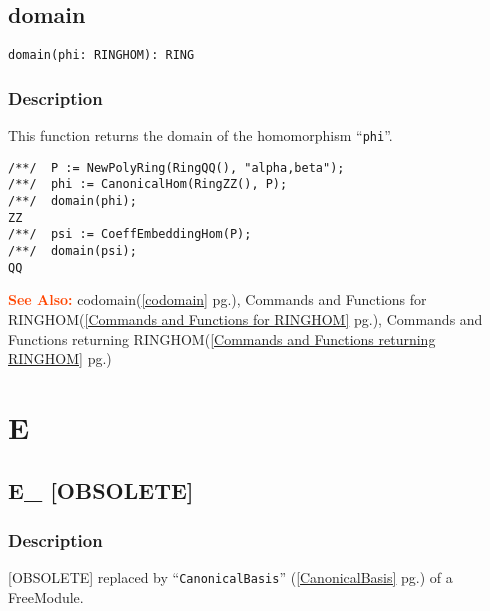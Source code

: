 \documentclass[a4paper]{mybook}
\newenvironment{command}{}{} %
\newcommand\SeeAlso{\par\textcolor{OrangeRed}{\textbf{\large See Also: }}}
\begin{document}
\section{domain}
\label{domain}
\begin{command} %


\begin{Verbatim}[label=syntax, rulecolor=\color{MidnightBlue},
frame=single]
domain(phi: RINGHOM): RING
\end{Verbatim}


\subsection*{Description}

This function returns the domain of the homomorphism ``\verb&phi&''.
\begin{Verbatim}[label=example, rulecolor=\color{PineGreen}, frame=single]
/**/  P := NewPolyRing(RingQQ(), "alpha,beta");
/**/  phi := CanonicalHom(RingZZ(), P);
/**/  domain(phi);
ZZ
/**/  psi := CoeffEmbeddingHom(P);
/**/  domain(psi);
QQ
\end{Verbatim}


\SeeAlso %
  codomain(\ref{codomain} pg.\pageref{codomain}), 
    Commands and Functions for RINGHOM(\ref{Commands and Functions for RINGHOM} pg.\pageref{Commands and Functions for RINGHOM}), 
    Commands and Functions returning RINGHOM(\ref{Commands and Functions returning RINGHOM} pg.\pageref{Commands and Functions returning RINGHOM})
\end{command} %

\chapter{E}  %
\label{E}

\section{E\_ [OBSOLETE]}
\label{E [OBSOLETE]}
\begin{command} %



\subsection*{Description}

[OBSOLETE] replaced by ``\verb&CanonicalBasis&'' (\ref{CanonicalBasis} pg.\pageref{CanonicalBasis}) of a FreeModule.

\end{command} %
\end{document}
